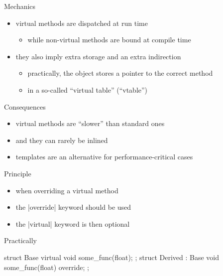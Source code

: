 \begin{frame}[fragile]
  \begin{block}{Mechanics}
    \begin{itemize}
    \item virtual methods are dispatched at run time
      \begin{itemize}
      \item while non-virtual methods are bound at compile time
      \end{itemize}
    \item they also imply extra storage and an extra indirection
      \begin{itemize}
      \item practically, the object stores a pointer to the correct method
      \item in a so-called ``virtual table'' (``vtable'')
      \end{itemize}
    \end{itemize}
  \end{block}
  \begin{alertblock}{Consequences}
    \begin{itemize}
    \item virtual methods are ``slower'' than standard ones
    \item and they can rarely be inlined
    \item templates are an alternative for performance-critical cases
    \end{itemize}
  \end{alertblock}
\end{frame}

\begin{frame}[fragile]
  \begin{block}{Principle}
    \begin{itemize}
    \item when overriding a virtual method
    \item the \cppinline|override| keyword should be used
    \item the \cppinline|virtual| keyword is then optional
    \end{itemize}
  \end{block}
  \begin{exampleblock}{Practically}
    \begin{cppcode}
      struct Base {
        virtual void some_func(float);
      };
      struct Derived : Base {
        void some_func(float) override;
      };
    \end{cppcode}
  \end{exampleblock}
\end{frame}

